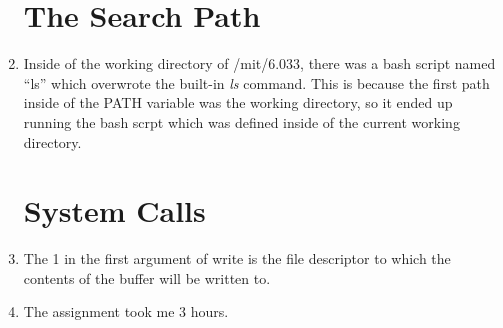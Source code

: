 \documentclass[psamsfonts]{amsart}
\begin{document}
\begin{enumerate}
    \section{The Search Path}
  \item Inside of the working directory of /mit/6.033, there was a bash script named ``ls'' which overwrote the built-in \emph{ls} command. This is because the first path inside of the PATH variable was the working directory, so it ended up running the bash scrpt which was defined inside of the current working directory.
    \section{System Calls}
  \item The 1 in the first argument of write is the file descriptor to which the contents of the buffer will be written to.
  \item The assignment took me 3 hours.
\end{enumerate}
\end{document}
